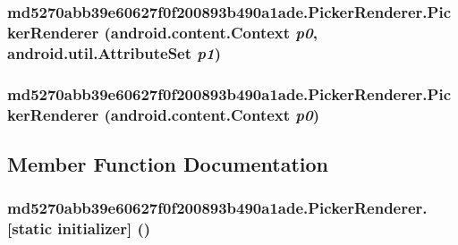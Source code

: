 \hypertarget{classmd5270abb39e60627f0f200893b490a1ade_1_1_picker_renderer_156d92620e136f1f59df295adf38b21e}{
\subsubsection[{PickerRenderer}]{\setlength{\rightskip}{0pt plus 5cm}md5270abb39e60627f0f200893b490a1ade.PickerRenderer.PickerRenderer (android.content.Context {\em p0}, \/  android.util.AttributeSet {\em p1})}}
\label{classmd5270abb39e60627f0f200893b490a1ade_1_1_picker_renderer_156d92620e136f1f59df295adf38b21e}


\hypertarget{classmd5270abb39e60627f0f200893b490a1ade_1_1_picker_renderer_c8b874ff9d60efd6f0108f2c112b26b9}{
\subsubsection[{PickerRenderer}]{\setlength{\rightskip}{0pt plus 5cm}md5270abb39e60627f0f200893b490a1ade.PickerRenderer.PickerRenderer (android.content.Context {\em p0})}}
\label{classmd5270abb39e60627f0f200893b490a1ade_1_1_picker_renderer_c8b874ff9d60efd6f0108f2c112b26b9}




\subsection{Member Function Documentation}
\hypertarget{classmd5270abb39e60627f0f200893b490a1ade_1_1_picker_renderer_7f4af5558fac1d77cc8636bb243421cf}{
\subsubsection[{[static initializer]}]{\setlength{\rightskip}{0pt plus 5cm}md5270abb39e60627f0f200893b490a1ade.PickerRenderer.\mbox{[}static initializer\mbox{]} ()}}
\label{classmd5270abb39e60627f0f200893b490a1ade_1_1_picker_renderer_7f4af5558fac1d77cc8636bb243421cf}




